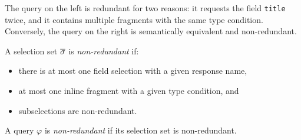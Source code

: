 \noindent The query on the left is redundant for two reasons: it requests the field
\texttt{title} twice, and it contains multiple fragments with
the same type condition. %
Conversely, the query on the right is semantically equivalent and non-redundant. %

\begin{definition}
A \gql selection set $\overline{\sigma}$ is \textit{non-redundant} if:
\begin{itemize}
    \item there is at most one field selection with a given response name, 
    
    \item at most one inline fragment with a given type condition, and
    
    \item subselections are non-redundant.
    \end{itemize}

\noindent    A \gql query $\varphi$ is \textit{non-redundant} if its selection set is non-redundant.

\end{definition}




